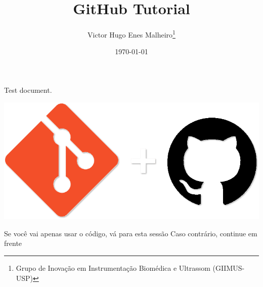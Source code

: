 \documentclass[12pt, letterpaper]{book}
\title{GitHub Tutorial}
\author{Victor Hugo Enes Malheiro\thanks{Grupo de Inovação em Instrumentação Biomédica e Ultrassom (GIIMUS-USP)}}
\date{\today}
\begin{document}
\maketitle

Test document.

\includegraphics{git-and-github-logos.png}

Se você vai apenas usar o código, vá para esta sessão
Caso contrário, continue em frente
\end{document}
